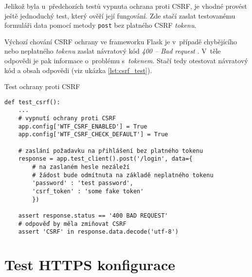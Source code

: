 Jelikož byla u~předchozích testů vypnuta ochrana proti CSRF, je vhodné provést ještě jednoduchý test, který ověří její fungování. Zde stačí zaslat testovanému formuláři data pomocí metody \texttt{post} bez platného CSRF \textit{tokenu}.

Výchozí chování CSRF ochrany ve frameworku Flask je v~případě chybějícího nebo neplatného \textit{tokenu} zaslat návratový kód \textit{400 -- Bad request} \cite{flask_wtf}. V~těle odpovědi je pak informace o~problému s~\textit{tokenem}. Stačí tedy otestovat návratový kód a obsah odpovědi (viz ukázka \ref{lst:csrf_test}).

\begin{listing}[htbp]
\caption{\label{lst:csrf_test} Test ochrany proti CSRF}
\begin{verbatim}
def test_csrf():
    ...
    # vypnutí ochrany proti CSRF
    app.config['WTF_CSRF_ENABLED'] = True
    app.config['WTF_CSRF_CHECK_DEFAULT'] = True

    # zaslání požadavku na přihlášení bez platného tokenu
    response = app.test_client().post('/login', data={
        # na zaslaném hesle nezáleží
        # žádost bude odmítnuta na základě neplatného tokenu
        'password' : 'test password',
        'csrf_token' : 'some fake token'
        })

    assert response.status == '400 BAD REQUEST'
    # odpověď by měla zmiňovat CSRF
    assert 'CSRF' in response.data.decode('utf-8')
\end{verbatim}
\end{listing}


\section{Test HTTPS konfigurace}


